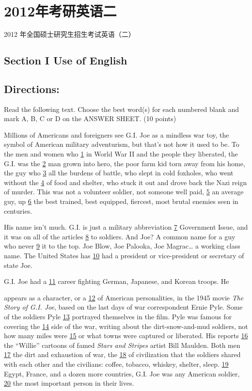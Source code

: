 \documentclass[UTF8,11pt]{ctexart}
\begin{document}
\section*{2012年考研英语二}
2012 年全国硕士研究生招生考试英语（二）


\subsection*{\textbf{Section I Use of English}}


\subsection*{\textbf{Directions:}}


Read the following text. Choose the best word(s) for each numbered blank and mark A, B, C or D on the ANSWER SHEET. (10 points)


Millions of Americans and foreigners see G.I. Joe as a mindless war toy, the symbol of American military adventurism, but that’s not how it used to be. To the men and women who \uline{1} in World War II and the people they liberated, the G.I. was the \uline{2} man grown into hero, the poor farm kid torn away from his home, the guy who \uline{3} all the burdens of battle, who slept in cold foxholes, who went without the \uline{4} of food and shelter, who stuck it out and drove back the Nazi reign of murder. This was not a volunteer soldier, not someone well paid, \uline{5} an average guy, up \uline{6} the best trained, best equipped, fiercest, most brutal enemies seen in centuries.


His name isn’t much. G.I. is just a military abbreviation \uline{7} Government Issue, and it was on all of the articles \uline{8} to soldiers. And Joe? A common name for a guy who never \uline{9} it to the top. Joe Blow, Joe Palooka, Joe Magrac… a working class name. The United States has \uline{10} had a president or vice-president or secretary of state Joe.


G.I. Joe had a \uline{11} career fighting German, Japanese, and Korean troops. He


appears as a character, or a \uline{12} of American personalities, in the 1945 movie \textit{The} \textit{Story of G.I. Joe}, based on the last days of war correspondent Ernie Pyle. Some of the soldiers Pyle \uline{13} portrayed themselves in the film. Pyle was famous for covering the \uline{14} side of the war, writing about the dirt-snow-and-mud soldiers, not how many miles were \uline{15} or what towns were captured or liberated. His reports \uline{16} the “Willie” cartoons of famed \textit{Stars and Stripes} artist Bill Maulden. Both men \uline{17} the dirt and exhaustion of war, the \uline{18} of civilization that the soldiers shared with each other and the civilians: coffee, tobacco, whiskey, shelter, sleep. \uline{19} Egypt, France, and a dozen more countries, G.I. Joe was any American soldier, \uline{20} the most important person in their lives.
\end{document}

